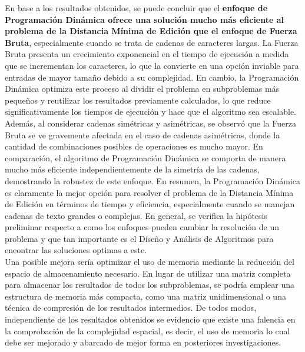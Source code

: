 En base a los resultados obtenidos, se puede concluir que el \textbf{enfoque de Programación Dinámica ofrece una solución mucho más eficiente al problema de la Distancia Mínima de Edición que el enfoque de Fuerza Bruta}, especialmente cuando se trata de cadenas de caracteres largas. La Fuerza Bruta presenta un crecimiento exponencial en el tiempo de ejecución a medida que se incrementan los caracteres, lo que la convierte en una opción inviable para entradas de mayor tamaño debido a su complejidad. En cambio, la Programación Dinámica optimiza este proceso al dividir el problema en subproblemas más pequeños y reutilizar los resultados previamente calculados, lo que reduce significativamente los tiempos de ejecución y hace que el algoritmo sea escalable.\\

Además, al considerar cadenas simétricas y asimétricas, se observó que la Fuerza Bruta se ve gravemente afectada en el caso de cadenas asimétricas, donde la cantidad de combinaciones posibles de operaciones es mucho mayor. En comparación, el algoritmo de Programación Dinámica se comporta de manera mucho más eficiente independientemente de la simetría de las cadenas, demostrando la robustez de este enfoque. En resumen, la Programación Dinámica es claramente la mejor opción para resolver el problema de la Distancia Mínima de Edición en términos de tiempo y eficiencia, especialmente cuando se manejan cadenas de texto grandes o complejas. En general, se verifica la hipótesis preliminar respecto a como los enfoques pueden cambiar la resolución de un problema y que tan importante es el Diseño y Análisis de Algoritmos para encontrar las soluciones optimas a este.\\

Una posible mejora sería optimizar el uso de memoria mediante la reducción del espacio de almacenamiento necesario. En lugar de utilizar una matriz completa para almacenar los resultados de todos los subproblemas, se podría emplear una estructura de memoria más compacta, como una matriz unidimensional o una técnica de compresión de los resultados intermedios. De todos modos, independiente de los resultados obtenidos se evidencio que existe una falencia en la comprobación de la complejidad espacial, es decir, el uso de memoria lo cual debe ser mejorado y abarcado de mejor forma en posteriores investigaciones.